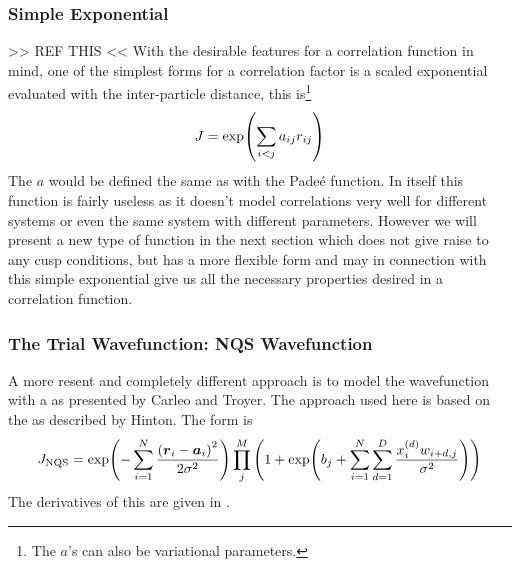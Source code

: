     \subsubsection{Simple Exponential}
        >> REF THIS << With the desirable features for a correlation function
        in mind, one of the simplest forms for a correlation factor is a scaled
        exponential evaluated with the inter-particle distance, this
        is\footnote{The $a$'s can also be variational parameters.}
            \begin{equation}
                J = \exp(\sum\limits_{i<j} a_{ij} r_{ij})
            \end{equation}
        The $a$ would be defined the same as with the Pade\'e function. In
        itself this function is fairly useless as it doesn't model correlations
        very well for different systems or even the same system with different
        parameters. However we will present a new type of function in the next
        section which does not give raise to any cusp conditions, but has a
        more flexible form and may in connection with this simple exponential
        give us all the necessary properties desired in a correlation function.

    \subsubsection{The Trial Wavefunction: NQS Wavefunction
    \label{sususec:NQSJastrow}}
        A more resent and completely different approach is to model the
        wavefunction with a  as presented by Carleo and
        Troyer\cite{CarleoANN}. The approach used here is based on the
         as described by
        Hinton\cite{RBMpractical}. The form is
            \begin{equation}
                J_{\text{NQS}} = \exp(-\suml{i=1}{N} \frac{\left(\blds{r}_i -
                \blds{a}_i\right)^2}{2\sigma^2})\prod\limits^{M}_j \left(1 +
                \exp(b_j + \suml{i=1}{N}\suml{d=1}{D}
                \frac{x^{(d)}_iw_{i+d,j}}{\sigma^2})\right)
                \label{eq:nqsdef}
            \end{equation}
        The derivatives of this are given in .

